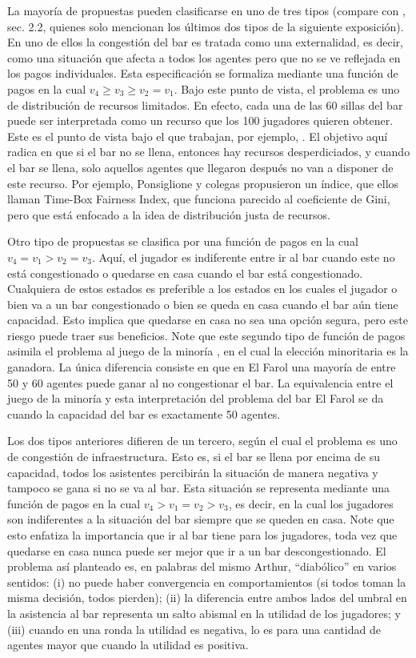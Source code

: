\documentclass[11pt]{amsart}
\begin{document}
La mayoría de propuestas pueden clasificarse en uno de tres tipos (compare con \cite{Chen2017}, sec. 2.2, quienes solo mencionan los últimos dos tipos de la siguiente exposición). En uno de ellos la congestión del bar es tratada como una externalidad, es decir, como una situación que afecta a todos los agentes pero que no se ve reflejada en los pagos individuales. Esta especificación se formaliza mediante una función de pagos en la cual $v_4 \geq v_3 \geq v_2=v_1$. Bajo este punto de vista, el problema es uno de distribución de recursos limitados. En efecto, cada una de las 60 sillas del bar puede ser interpretada como un recurso que los 100 jugadores quieren obtener. Este es el punto de vista bajo el que trabajan, por ejemplo, \cite{Challet2004, Ponsiglione2015}. El objetivo aquí radica en que si el bar no se llena, entonces hay recursos desperdiciados, y cuando el bar se llena, solo aquellos agentes que llegaron después no van a disponer de este recurso. Por ejemplo, Ponsiglione y colegas \cite{Ponsiglione2015} propusieron un índice, que ellos llaman Time-Box Fairness Index, que funciona parecido al coeficiente de Gini, pero que está enfocado a la idea de distribución justa de recursos. 

Otro tipo de propuestas se clasifica por una función de pagos en la cual $v_4=v_1 > v_2=v_3$. Aquí, el jugador es indiferente entre ir al bar cuando este no está congestionado o quedarse en casa cuando el bar está congestionado. Cualquiera de estos estados es preferible a los estados en los cuales el jugador o bien va a un bar congestionado o bien se queda en casa cuando el bar aún tiene capacidad. Esto implica que quedarse en casa no sea una opción segura, pero este riesgo puede traer sus beneficios. Note que este segundo tipo de función de pagos asimila el problema al juego de la minoría \cite{Challet1997}, en el cual la elección minoritaria es la ganadora. La única diferencia consiste en que en El Farol una mayoría de entre 50 y 60 agentes puede ganar al no congestionar el bar. La equivalencia entre el juego de la minoría y esta interpretación del problema del bar El Farol se da cuando la capacidad del bar es exactamente 50 agentes.

Los dos tipos anteriores difieren de un tercero, según el cual el problema es uno de congestión de infraestructura. Esto es, si el bar se llena por encima de su capacidad, todos los asistentes percibirán la situación de manera negativa y tampoco se gana si no se va al bar. Esta situación se representa mediante una función de pagos en la cual $v_4 > v_1=v_2 > v_3$, es decir, en la cual los jugadores son indiferentes a la situación del bar siempre que se queden en casa. Note que esto enfatiza la importancia que ir al bar tiene para los jugadores, toda vez que quedarse en casa nunca puede ser mejor que ir a un bar descongestionado. El problema así planteado es, en palabras del mismo Arthur, “diabólico” en varios sentidos: (i) no puede haber convergencia en comportamientos (si todos toman la misma decisión, todos pierden); (ii) la diferencia entre ambos lados del umbral en la asistencia al bar representa un salto abismal en la utilidad de los jugadores; y (iii) cuando en una ronda la utilidad es negativa, lo es para una cantidad de agentes mayor que cuando la utilidad es positiva.
\end{document}
